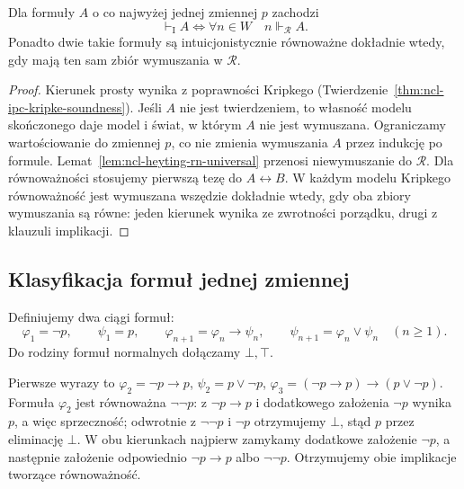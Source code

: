 \begin{wniosek}
\label{cor:ncl-heyting-rn-complete-model}
Dla formuły $A$ o co najwyżej jednej zmiennej $p$
zachodzi
\[
 \vdash_{\mathrm I} A\iff
 \forall n\in W\quad n\Vdash_{\mathcal R} A.
\]
Ponadto dwie takie formuły są intuicjonistycznie
równoważne dokładnie wtedy, gdy mają ten sam
zbiór wymuszania w $\mathcal R$.
\end{wniosek}
\begin{proof}
Kierunek prosty wynika z poprawności Kripkego
(Twierdzenie~\ref{thm:ncl-ipc-kripke-soundness}).
Jeśli $A$ nie jest twierdzeniem, to własność
modelu skończonego daje model i świat,
w którym $A$ nie jest wymuszana.
Ograniczamy wartościowanie do zmiennej $p$,
co nie zmienia wymuszania $A$ przez indukcję
po formule. Lemat~\ref{lem:ncl-heyting-rn-universal}
przenosi niewymuszanie do $\mathcal R$.
Dla równoważności stosujemy pierwszą tezę
do $A\leftrightarrow B$. W każdym modelu
Kripkego równoważność jest wymuszana wszędzie
dokładnie wtedy, gdy oba zbiory wymuszania są
równe: jeden kierunek wynika ze zwrotności
porządku, drugi z klauzuli implikacji.
\end{proof}

\subsection{Klasyfikacja formuł jednej zmiennej}

\begin{definicja}
\label{def:ncl-heyting-rn-formulas}
Definiujemy dwa ciągi formuł:
\[
 \varphi_1=\neg p,\qquad \psi_1=p,\qquad
 \varphi_{n+1}=\varphi_n\to\psi_n,\qquad
 \psi_{n+1}=\varphi_n\vee\psi_n\quad(n\geq1).
\]
Do rodziny formuł normalnych dołączamy $\bot,\top$.
\end{definicja}
Pierwsze wyrazy to $\varphi_2=\neg p\to p$,
$\psi_2=p\vee\neg p$,
$\varphi_3=(\neg p\to p)\to(p\vee\neg p)$.
Formuła $\varphi_2$ jest równoważna $\neg\neg p$:
z $\neg p\to p$ i dodatkowego założenia $\neg p$
wynika $p$, a więc sprzeczność; odwrotnie
z $\neg\neg p$ i $\neg p$ otrzymujemy $\bot$,
stąd $p$ przez eliminację $\bot$.
W obu kierunkach najpierw zamykamy dodatkowe
założenie $\neg p$, a następnie założenie
odpowiednio $\neg p\to p$ albo $\neg\neg p$.
Otrzymujemy obie implikacje tworzące równoważność.

